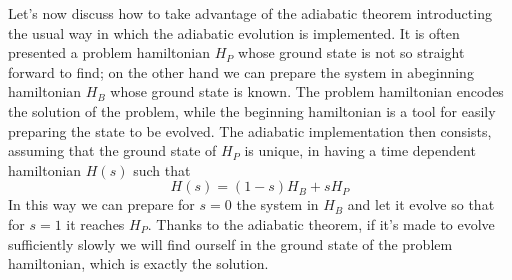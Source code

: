     Let's now discuss how to take advantage of the adiabatic theorem introducting the usual way in which the adiabatic evolution is implemented. It is often presented a problem hamiltonian $H_P$ whose ground state is not so straight forward to find; on the other hand we can prepare the system in abeginning hamiltonian $H_B$ whose ground state is known. The problem hamiltonian encodes the solution of the problem, while the beginning hamiltonian is a tool for easily preparing the state to be evolved. The adiabatic implementation then consists, assuming that the ground state of $H_P$ is unique, in having a time dependent hamiltonian $H(s)$ such that
    \begin{equation}
        H(s) = (1-s)H_B + s H_P
    \end{equation}
    In this way we can prepare for $s=0$ the system in $H_B$ and let it evolve so that for $s=1$ it reaches $H_P$. Thanks to the adiabatic theorem, if it's made to evolve sufficiently slowly we will find ourself in the ground state of the problem hamiltonian, which is exactly the solution.

